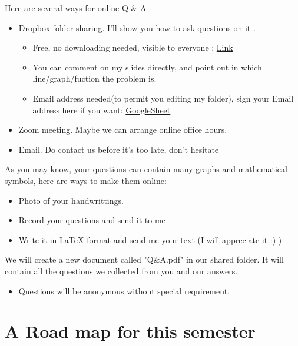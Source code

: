 \documentclass{article}
\begin{document}
Here are several ways for online Q \& A 
\begin{itemize}
\item \href{https://www.dropbox.com/referrals/AACx30a_-sudYoShl6zfNAQGKT2agvs-2wY?src=global9}{Dropbox} folder sharing. I'll show you how to ask questions on it .
\begin{itemize}
\item Free, no downloading needed, visible to everyone : \href{https://www.dropbox.com/sh/a7igfgfgwwsx1w5/AABlcL6h_JBGl-AZDJCHyP6ga?dl=0}{Link}
\item You can comment on my slides directly, and point out in which line/graph/fuction the problem is.
\item Email address needed(to permit you editing my folder), sign your Email address here if you want: \href{https://docs.google.com/spreadsheets/d/1pNukxmwu8BX5blj0uOcLB7XxZX7gxgjpQsle1yO1vZI/edit?usp=sharing}{GoogleSheet}
\end{itemize}

\item Zoom meeting. Maybe we can arrange online office hours.
\item Email. Do contact us before it's too late, don't hesitate
\end{itemize}

\bigskip

As you may know, your questions can contain many graphs and mathematical symbols, here are ways to make them online:

\begin{itemize}
\item Photo of your handwrittings.
\item Record your questions and send it to me
\item Write it in \LaTeX{} format and send me your text (I will appreciate it :) )
\end{itemize}

\bigskip

We will create a new document called "Q\&A.pdf" in our shared folder. It will contain all the questions we collected from you and our answers.
\begin{itemize}
\item Questions will be anonymous without special requirement.
\end{itemize}

\newpage

\section*{A Road map for this semester}
\end{document}
